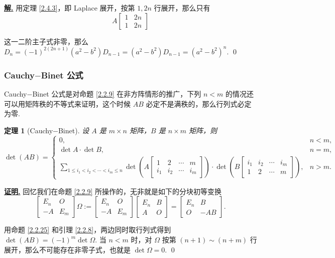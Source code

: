 \documentclass[10pt,openany]{article}
\theoremstyle{thmstyle} %
\newtheorem{theorem}{定理}[subsection]
\theoremstyle{defstyle} %
\theoremstyle{prostyle} %
\theoremstyle{exastyle}
\theoremstyle{remstyle}
\renewenvironment{proof}[1][证明]{\par\underline{\textbf{#1.}} \;\fangsong}{\qed\par}
\newenvironment{solution}{\par\underline{\textbf{解.}} \;\fangsong}{\qed\par}
\begin{document}
\begin{solution}
	用定理 \ref{2.4.3}，即 Laplace 展开，按第 \( 1, 2n \) 行展开，那么只有
	\[ A\begin{bmatrix}
		1 & 2n \\
		1 & 2n
	\end{bmatrix} \]
	
	这一二阶主子式非零，那么 \( D_n=(-1)^{2(2n+1)}(a^2-b^2)D_{n-1}=(a^2-b^2)D_{n-1}=(a^2-b^2)^n \).
\end{solution}

\subsubsection{Cauchy\(-\)Binet 公式}

Cauchy\(-\)Binet 公式是对命题 \ref{2.2.9} 在非方阵情形的推广，下列 \( n<m \) 的情况还可以用矩阵秩的不等式来证明，这个时候 \( AB \) 必定不是满秩的，那么行列式必定为零. 

\begin{theorem}[Cauchy\(-\)Binet] \label{2.4.5}
	设 \( A \) 是 \( m \times n \) 矩阵，\( B \) 是 \( n \times m \) 矩阵，则
	\[
	\det(AB) =
	\left\{
	\begin{array}{lr}
		0, & n < m, \\
		\det A \cdot \det B, & n = m, \\
		\displaystyle
		\sum_{1 \leq i_1 < i_2 < \cdots < i_m \leq n}
		\det\left(
		A\begin{bmatrix}
			1 & 2 & \cdots & m \\
			i_1 & i_2 & \cdots & i_m
		\end{bmatrix}
		\right)
		\cdot
		\det\left(
		B\begin{bmatrix}
			i_1 & i_2 & \cdots & i_m \\
			1 & 2 & \cdots & m
		\end{bmatrix}
		\right), & n > m.
	\end{array}
	\right.
	\]
\end{theorem}

\begin{proof}
	回忆我们在命题 \ref{2.2.9} 所操作的，无非就是如下的分块初等变换
	\[ \begin{bmatrix}
		E_n & O \\
		-A & E_m
	\end{bmatrix} \Omega:=\begin{bmatrix}
	E_n & O \\
	-A & E_m
	\end{bmatrix}\begin{bmatrix}
		E_n & B \\
		A & O
	\end{bmatrix}=\begin{bmatrix}
	E_n & B \\
	O & -AB 
	\end{bmatrix}.
	\]
	
	用命题 \ref{2.2.25} 和引理 \ref{2.2.8}，两边同时取行列式得到 \( \det(AB)=(-1)^m \det \Omega \). 当 \( n<m \) 时，对 \( \Omega \) 按第 \( (n+1) \sim (n+m) \) 行展开，那么不可能存在非零子式，也就是 \( \det \Omega=0 \).
\end{proof}
\end{document}
